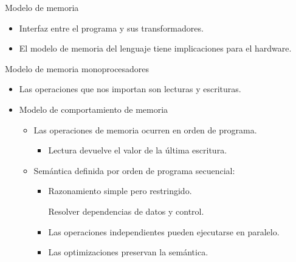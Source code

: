 \documentclass[12pt, twoside, openright]{report} %
\begin{document}
    Modelo de memoria

    \begin{itemize}
    
    \item
      Interfaz entre el programa y sus transformadores.
    \item
      El modelo de memoria del lenguaje tiene implicaciones para el
      hardware.

      \begin{figure}[H]
        {\def\svgwidth{.8\textwidth}
      }
      \end{figure}
    \end{itemize}

    Modelo de memoria monoprocesadores

    \begin{itemize}
    
    \item
      Las operaciones que nos importan son lecturas y escrituras.
    \item
      Modelo de comportamiento de memoria

      \begin{itemize}
      
      \item
        Las operaciones de memoria ocurren en orden de programa.

        \begin{itemize}
        
        \item
          Lectura devuelve el valor de la última escritura.
        \end{itemize}
      \item
        Semántica definida por orden de programa secuencial:

        \begin{itemize}
        
        \item
          Razonamiento simple pero restringido.

            Resolver dependencias de datos y control.

            \item
          Las operaciones independientes pueden ejecutarse en
          paralelo.
        \item
          Las optimizaciones preservan la semántica.
        \end{itemize}
      \end{itemize}
    \end{itemize}
\end{document}
